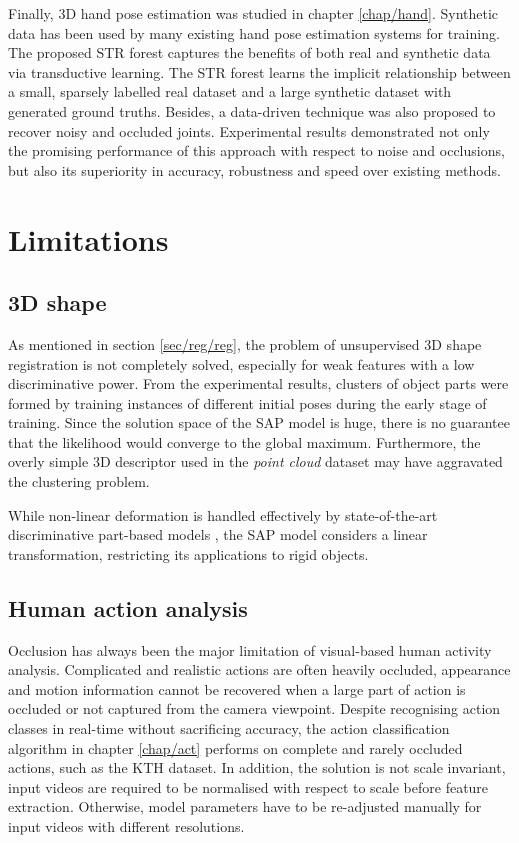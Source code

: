Finally, 3D hand pose estimation was studied in chapter \ref{chap/hand}. Synthetic data has been used by many existing hand pose estimation systems for training. The proposed STR forest captures the benefits of both real and synthetic data via transductive learning. The STR forest learns the implicit relationship between a small, sparsely labelled real dataset and a large synthetic dataset with generated ground truths. Besides, a data-driven technique was also proposed to recover noisy and occluded joints. Experimental results demonstrated not only the promising performance of this approach with respect to noise and occlusions, but also its superiority in accuracy, robustness and speed over existing methods.

\section{Limitations}

\subsection{3D shape} 

As mentioned in section \ref{sec/reg/reg}, the problem of unsupervised 3D shape registration is not completely solved, especially for weak features with a low discriminative power. From the experimental results, clusters of object parts were formed by training instances of different initial poses during the early stage of training. Since the solution space of the SAP model is huge, there is no guarantee that the likelihood would converge to the global maximum. Furthermore, the overly simple 3D descriptor used in the \emph{point cloud} dataset may have aggravated the clustering problem.   

While non-linear deformation is handled effectively by state-of-the-art discriminative part-based models \cite{Felzenszwalb2010, Andriluka2009, Pishchulin2012}, the SAP model considers a linear transformation, restricting its applications to rigid objects. 

\subsection{Human action analysis} 

Occlusion has always been the major limitation of visual-based human activity analysis. Complicated and realistic actions are often heavily occluded, appearance and motion information cannot be recovered when a large part of action is occluded or not captured from the camera viewpoint. 
Despite recognising action classes in real-time without sacrificing accuracy, the action classification algorithm in chapter \ref{chap/act} performs on complete and rarely occluded actions, such as the KTH dataset. 
In addition, the solution is not scale invariant, input videos are required to be normalised with respect to scale before feature extraction. Otherwise, model parameters have to be re-adjusted manually for input videos with different resolutions.  

